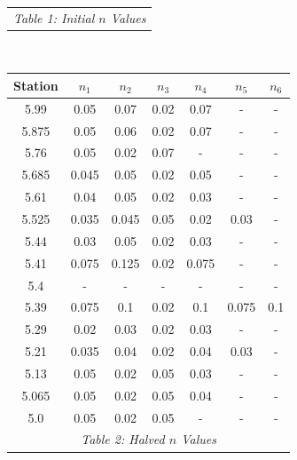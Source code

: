\begin{center}
\begin{tabular}{|c|cccccc|}
    \hline\multicolumn{7}{c}{\emph{Table 1: Initial $n$ Values}}
\end{tabular}
\\\vspace{10mm}
\begin{tabular}{|c|cccccc|} 
    \hline
    \textbf{Station} & $n_1$ & $n_2$ & $n_3$ & $n_4$ & $n_5$ & $n_6$  \\ 
    \hline
    5.99             & 0.05     & 0.07     & 0.02     & 0.07     & -        & -         \\
    5.875            & 0.05     & 0.06     & 0.02     & 0.07     & -        & -         \\
    5.76             & 0.05     & 0.02     & 0.07     & -        & -        & -         \\
    5.685            & 0.045    & 0.05     & 0.02     & 0.05     & -        & -         \\
    5.61             & 0.04     & 0.05     & 0.02     & 0.03     & -        & -         \\
    5.525            & 0.035    & 0.045    & 0.05     & 0.02     & 0.03     & -         \\
    5.44             & 0.03     & 0.05     & 0.02     & 0.03     & -        & -         \\
    5.41             & 0.075    & 0.125    & 0.02     & 0.075    & -        & -         \\
    5.4              & -        & -        & -        & -        & -        & -         \\
    5.39             & 0.075    & 0.1      & 0.02     & 0.1      & 0.075    & 0.1       \\
    5.29             & 0.02     & 0.03     & 0.02     & 0.03     & -        & -         \\
    5.21             & 0.035    & 0.04     & 0.02     & 0.04     & 0.03     & -         \\
    5.13             & 0.05     & 0.02     & 0.05     & 0.03     & -        & -         \\
    5.065            & 0.05     & 0.02     & 0.05     & 0.04     & -        & -         \\
    5.0              & 0.05     & 0.02     & 0.05     & -        & -        & -         \\
    \hline\multicolumn{7}{c}{\emph{Table 2: Halved $n$ Values}}
\end{tabular}
\\\vspace{1mm}

\end{center}
